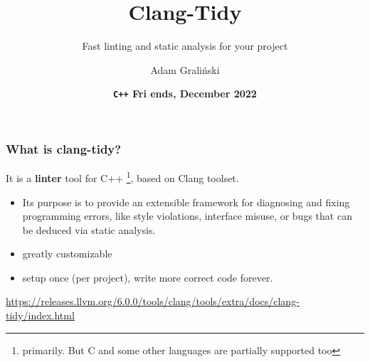 \documentclass[aspectratio=169]{beamer}
\title[Friends\#26 :: \cpp{Clang-Tidy}]{Clang-Tidy}
\subtitle{Fast linting and static analysis for your \cpp{C++} project}
\author{Adam Graliński}
\date[Dec'22]{\textbf{\texttt{\color[HTML]{d33682}C++} {\color[HTML]{268bd2}F}{\color[HTML]{2aa198}r}{\color[HTML]{859900}i}%
{\color[HTML]{cb4b16}e}{\color[HTML]{dc322f}n}{\color[HTML]{6c71c4}d}{\color[HTML]{b58900}s}, December 2022}}
\begin{document}
{
\begin{frame}
\titlepage{}
\end{frame}
}

\begin{frame}[fragile]
\frametitle{What is clang-tidy?}
  It is a \textbf{\textcolor{clTwelveBitOrange}{linter}} tool for C++%
\footnote[frame]{primarily. But C and some other languages are partially supported too},
  based on Clang toolset.
  \begin{itemize}
    \item{} Its purpose is to provide an extensible framework for diagnosing and fixing programming errors,
            like style violations, interface misuse, or bugs that can be deduced via static analysis.
    \item{} greatly customizable
    \item{} setup once (per project), write more correct code forever.
  \end{itemize}
  \vspace*{24pt}
  {\fontsize{9}{9} \url{https://releases.llvm.org/6.0.0/tools/clang/tools/extra/docs/clang-tidy/index.html}}
\end{frame}
\end{document}

